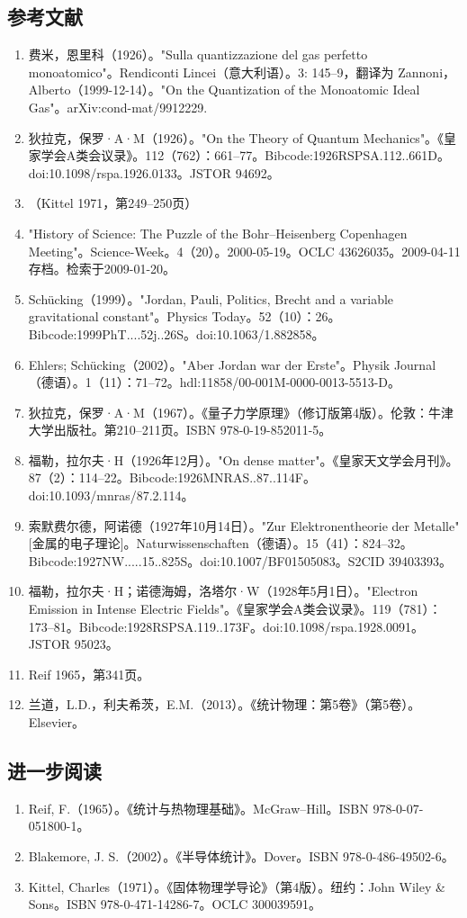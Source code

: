 \subsection{参考文献}  
\begin{enumerate}
\item 费米，恩里科（1926）。"Sulla quantizzazione del gas perfetto monoatomico"。Rendiconti Lincei（意大利语）。3: 145–9，翻译为 Zannoni，Alberto（1999-12-14）。"On the Quantization of the Monoatomic Ideal Gas"。arXiv:cond-mat/9912229.  
\item 狄拉克，保罗·A·M（1926）。"On the Theory of Quantum Mechanics"。《皇家学会A类会议录》。112（762）：661–77。Bibcode:1926RSPSA.112..661D。doi:10.1098/rspa.1926.0133。JSTOR 94692。  
\item （Kittel 1971，第249–250页）  
\item "History of Science: The Puzzle of the Bohr–Heisenberg Copenhagen Meeting"。Science-Week。4（20）。2000-05-19。OCLC 43626035。2009-04-11存档。检索于2009-01-20。  
\item Schücking（1999）。"Jordan, Pauli, Politics, Brecht and a variable gravitational constant"。Physics Today。52（10）：26。Bibcode:1999PhT....52j..26S。doi:10.1063/1.882858。  
\item Ehlers; Schücking（2002）。"Aber Jordan war der Erste"。Physik Journal（德语）。1（11）：71–72。hdl:11858/00-001M-0000-0013-5513-D。  
\item 狄拉克，保罗·A·M（1967）。《量子力学原理》（修订版第4版）。伦敦：牛津大学出版社。第210–211页。ISBN 978-0-19-852011-5。  
\item 福勒，拉尔夫·H（1926年12月）。"On dense matter"。《皇家天文学会月刊》。87（2）：114–22。Bibcode:1926MNRAS..87..114F。doi:10.1093/mnras/87.2.114。  
\item 索默费尔德，阿诺德（1927年10月14日）。"Zur Elektronentheorie der Metalle" [金属的电子理论]。Naturwissenschaften（德语）。15（41）：824–32。Bibcode:1927NW.....15..825S。doi:10.1007/BF01505083。S2CID 39403393。  
\item 福勒，拉尔夫·H；诺德海姆，洛塔尔·W（1928年5月1日）。"Electron Emission in Intense Electric Fields"。《皇家学会A类会议录》。119（781）：173–81。Bibcode:1928RSPSA.119..173F。doi:10.1098/rspa.1928.0091。JSTOR 95023。  
\item Reif 1965，第341页。  
\item 兰道，L.D.，利夫希茨，E.M.（2013）。《统计物理：第5卷》（第5卷）。Elsevier。
\end{enumerate}
\subsection{进一步阅读}
\begin{enumerate}  
\item Reif, F.（1965）。《统计与热物理基础》。McGraw–Hill。ISBN 978-0-07-051800-1。  
\item Blakemore, J. S.（2002）。《半导体统计》。Dover。ISBN 978-0-486-49502-6。  
\item Kittel, Charles（1971）。《固体物理学导论》（第4版）。纽约：John Wiley & Sons。ISBN 978-0-471-14286-7。OCLC 300039591。
\end{enumerate}